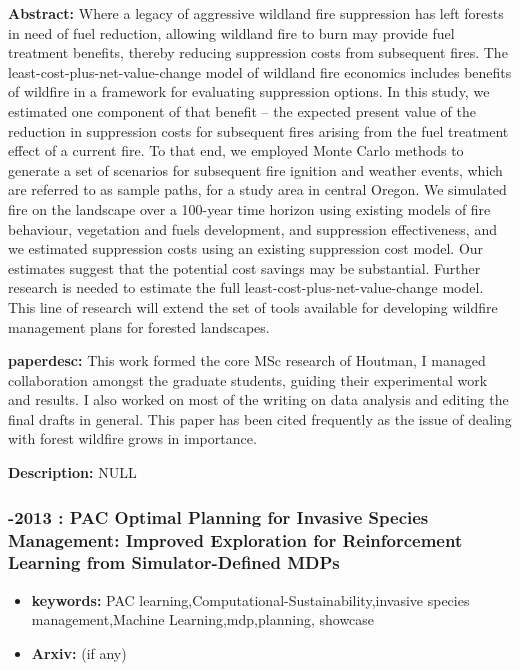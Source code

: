 \documentclass{article}
\begin{document}

\textbf{Abstract:} Where a legacy of aggressive wildland fire suppression has left forests in need of fuel reduction, allowing wildland fire to burn may provide fuel treatment benefits, thereby reducing suppression costs from subsequent fires. The least-cost-plus-net-value-change model of wildland fire economics includes benefits of wildfire in a framework for evaluating suppression options. In this study, we estimated one component of that benefit -- the expected present value of the reduction in suppression costs for subsequent fires arising from the fuel treatment effect of a current fire. To that end, we employed Monte Carlo methods to generate a set of scenarios for subsequent fire ignition and weather events, which are referred to as sample paths, for a study area in central Oregon. We simulated fire on the landscape over a 100-year time horizon using existing models of fire behaviour, vegetation and fuels development, and suppression effectiveness, and we estimated suppression costs using an existing suppression cost model. Our estimates suggest that the potential cost savings may be substantial. Further research is needed to estimate the full least-cost-plus-net-value-change model. This line of research will extend the set of tools available for developing wildfire management plans for forested landscapes.

\textbf{paperdesc:} This work formed the core MSc research of Houtman, I managed collaboration amongst the graduate students, guiding their experimental work and results. I also worked on most of the writing on data analysis and editing the final drafts in general. This paper has been cited frequently as the issue of dealing with forest wildfire grows in importance.

\textbf{Description:} NULL



\newpage
\subsubsection{\textbf{-2013} : PAC Optimal Planning for Invasive Species Management: Improved Exploration for Reinforcement Learning from Simulator-Defined MDPs}
\begin{itemize}
\item \textbf{keywords:} PAC learning,Computational-Sustainability,invasive species management,Machine Learning,mdp,planning, showcase
\item \textbf{Arxiv:}  (if any)
\end{itemize}
\end{document}
